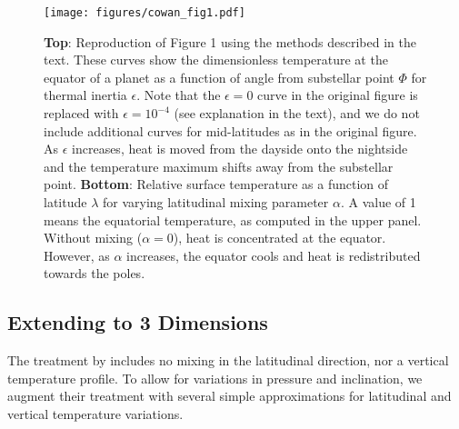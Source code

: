\documentclass[linenumbers,preprint,authoryear]{elsarticle}
\begin{document}
\begin{figure}
    \centering
    \texttt{[image: figures/cowan\_fig1.pdf]}
    \caption{
        {\bf Top}: Reproduction of \citet{cowan2011} Figure 1 using the methods described in the text. These curves show the dimensionless temperature at the equator of a planet as a function of angle from substellar point $\Phi$ for thermal inertia $\epsilon$. Note that the $\epsilon=0$ curve in the original figure is replaced with $\epsilon=10^{-4}$ (see explanation in the text), and we do not include additional curves for mid-latitudes as in the original figure. As $\epsilon$ increases, heat is moved from the dayside onto the nightside and the temperature maximum shifts away from the substellar point.
        {\bf Bottom}: Relative surface temperature as a function of latitude $\lambda$ for varying latitudinal mixing parameter $\alpha$. A value of 1 means the equatorial temperature, as computed in the upper panel. Without mixing ($\alpha=0$), heat is concentrated at the equator. However, as $\alpha$ increases, the equator cools and heat is redistributed towards the poles.
    }
    \label{fig:cowan_curves}
\end{figure}

\subsection{Extending to 3 Dimensions}

The treatment by \citet{cowan2011} includes no mixing in the latitudinal direction, nor a vertical temperature profile. To allow for variations in pressure and inclination, we augment their treatment with several simple approximations for latitudinal and vertical temperature variations. 
\end{document}
